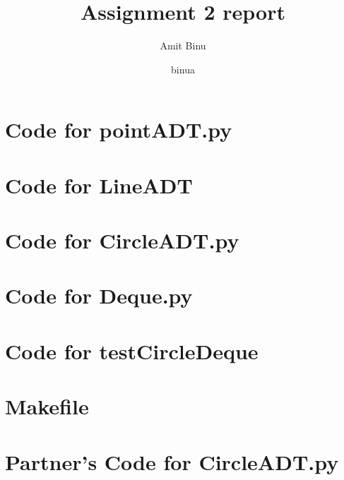 \documentclass[12pt]{article}
\begin{document}
\oddsidemargin 0mm
\evensidemargin 0mm
\textwidth 160mm
\textheight 200mm
\renewcommand\baselinestretch{1.0}
\pagestyle {plain}
\title {Assignment 2 report} 
\author {Amit Binu}
\date { binua }
\maketitle
\newpage
\lstset{language=Python, basicstyle=\tiny,breaklines=true,showspaces=false,showstringspaces=false,breakatwhitespace=true}
\def\thesection{\Alph{section}} 
\section{Code for pointADT.py} \label{PointADT}
\noindent 
\newpage
\section{Code for LineADT} \label{LineADT.py}
\noindent 
\newpage
\section{Code for CircleADT.py} \label{CircleADT.py}
\noindent 
\newpage
\section{Code for Deque.py} \label{Deque.py}
\noindent 
\newpage
\section{Code for testCircleDeque} \label{testCircleDeque.py}
\noindent 
\newpage
\section{Makefile} \label{MakefileSect}
\lstset{language=make}
\noindent 
\newpage
\newpage
\lstset{language=Python, basicstyle=\tiny,breaklines=true,showspaces=false,showstringspaces=false,breakatwhitespace=true}
\def\thesection{\Alph{section}} 
\section{Partner's Code for CircleADT.py} \label{CircleADTSect}
\noindent 
\newpage
\end{document}
